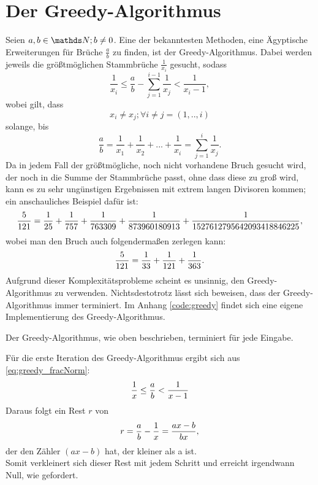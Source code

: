 \section{Der Greedy-Algorithmus}
Seien $a, b \in \N; b \neq 0$. Eine der bekanntesten Methoden, eine Ägyptische Erweiterungen für Brüche $\frac{a}{b}$ zu finden, ist der Greedy-Algorithmus. Dabei werden jeweils die größtmöglichen Stammbrüche $\frac{1}{x_i}$ gesucht, sodass
\begin{equation}\label{eq:greedy_fracNorm}
\frac{1}{x_i} \leq \frac{a}{b} - \sum_{j=1}^{i-1} \frac{1}{x_j} < \frac{1}{x_{i}-1},
\end{equation}
wobei gilt, dass
$$x_i \neq x_j; \forall i \neq j = (1,..,i)$$ 
solange, bis
$$\frac{a}{b} = \frac{1}{x_1} + \frac{1}{x_2} + ... + \frac{1}{x_i} = \sum_{j=1}^{i} \frac{1}{x_j}.$$
Da in jedem Fall der größtmögliche, noch nicht vorhandene Bruch gesucht wird, der noch in die Summe der Stammbrüche passt, ohne dass diese zu groß wird, kann es zu sehr ungünstigen Ergebnissen mit extrem langen Divisoren kommen; ein anschauliches Beispiel dafür ist:
$$\frac{5}{121} = \frac{1}{25} + \frac{1}{757} + \frac{1}{763309} + \frac{1}{873960180913} + \frac{1}{1527612795642093418846225},$$
wobei man den Bruch auch folgendermaßen zerlegen kann:
$$\frac{5}{121} = \frac{1}{33} + \frac{1}{121} + \frac{1}{363}.$$
Aufgrund dieser Komplexitätsprobleme scheint es unsinnig, den Greedy-Algorithmus zu verwenden. Nichtsdestotrotz lässt sich beweisen, dass der Greedy-Algorithmus immer terminiert.
Im Anhang \ref{code:greedy} findet sich eine eigene Implementierung des Greedy-Algorithmus.

\begin{satz}
	Der Greedy-Algorithmus, wie oben beschrieben, terminiert für jede Eingabe.
\end{satz}
\begin{bew}
	Für die erste Iteration des Greedy-Algorithmus ergibt sich aus \ref{eq:greedy_fracNorm}:
	\begin{equation*}
		\frac{1}{x} \leq \frac{a}{b} < \frac{1}{x-1}
	\end{equation*}
	Daraus folgt ein Rest $r$ von
	$$ r = \frac{a}{b}-\frac{1}{x} = \frac{ax-b}{bx},$$
	der den Zähler $(ax-b)$ hat,  der kleiner als a ist. \\ Somit verkleinert sich dieser Rest mit jedem Schritt und erreicht irgendwann Null, wie gefordert.
\end{bew}